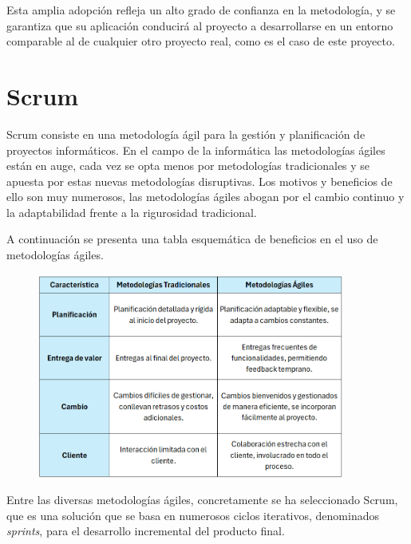 Esta amplia adopción refleja un alto grado de confianza en la metodología, y se garantiza que su aplicación conducirá al proyecto a desarrollarse en un entorno comparable al de cualquier otro proyecto real, como es el caso de este proyecto.

\section{Scrum} \label{sec:04crum} %

Scrum \parencite{scrumWebsite} consiste en una metodología ágil para la gestión y planificación de proyectos informáticos. En el campo de la informática las metodologías ágiles están en auge, cada vez se opta menos por metodologías tradicionales y se apuesta por estas nuevas metodologías disruptivas. Los motivos y beneficios de ello son muy numerosos, las metodologías ágiles abogan por el cambio continuo y la adaptabilidad frente a la rigurosidad tradicional. 

A continuación se presenta una tabla esquemática de beneficios en el uso de metodologías ágiles.

\begin{figure}[H]
    \centering
    \includegraphics[width=0.90\textwidth]{tables/tablaMetodologias.png}
    \label{table:tablaMetodologias}
\end{figure}

%

Entre las diversas metodologías ágiles, concretamente se ha seleccionado Scrum, que es una solución que se basa en numerosos ciclos iterativos, denominados \textit{sprints}, para el desarrollo incremental del producto final.

